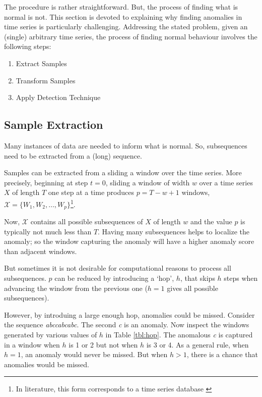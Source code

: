 The procedure is rather straightforward. But, the process of finding what is normal is not. This section is devoted to explaining why finding anomalies in time series is particularly challenging. Addressing the stated problem, given an (single) arbitrary time series, the process of finding normal behaviour involves the following steps:
\begin{enumerate}
\item Extract Samples
\item Transform Samples
\item Apply Detection Technique
\end{enumerate}

\subsection{Sample Extraction}

Many instances of data are needed to inform what is normal. So, subsequences need to be extracted from a (long) sequence.

Samples can be extracted from a sliding a window over the time series. More precisely, beginning at step $t=0$, sliding a window of width $w$ over a time series $X$ of length $T$ one step at a time produces $p=T-w+1$ windows, $\mathcal{X}=\{W_1,W_2,\ldots,W_p\}$\footnote{In literature, this form corresponds to a time series database \cite{Gupta2013}}.

Now, $\mathcal{X}$ contains all possible subsequences of $X$ of length $w$ and the value $p$ is typically not much less than $T$. Having many subsequences helps to localize the anomaly; so the window capturing the anomaly will have a higher anomaly score than adjacent windows.

But sometimes it is not desirable for computational reasons to process all subsequences. $p$ can be reduced by introducing a `hop', $h$, that skips $h$ steps when advancing the window from the previous one ($h=1$ gives all possible subsequences). 

However, by introduing a large enough hop, anomalies could be missed. Consider the sequence \emph{abccabcabc}. The second \emph{c} is an anomaly. Now inspect the windows generated by various values of $h$ in Table \ref{tbl:hop}. The anomalous \emph{c} is captured in a window when $h$ is 1 or 2 but not when $h$ is 3 or 4. As a general rule, when $h=1$, an anomaly would never be missed. But when $h>1$, there is a chance that anomalies would be missed.

